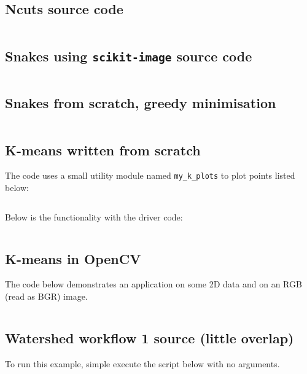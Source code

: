 \documentclass[a4paper]{article}
\begin{document}
\subsection{Ncuts source code}
\label{app:ncuts_code}
\inputminted{python}{src/ncuts/ncuts.py}

\newpage
\subsection{Snakes using \texttt{scikit-image} source code}
\label{app:snakes_code}
\inputminted{python}{src/snakes/snakes.py}

\newpage
\subsection{Snakes from scratch, greedy minimisation}
\label{app:my_snakes_code}
\inputminted{python}{src/snakes/mysnake.py}

\newpage
\subsection{K-means written from scratch}
\label{app:src_my_kmeans}
The code uses a small utility module named \texttt{my_k_plots} to plot points  listed below:
\inputminted{python}{src/kmeans/my_k_plots.py}
Below is the functionality with the driver code:
\inputminted{python}{src/kmeans/my_k_means.py}

\newpage
\subsection{K-means in OpenCV}
\label{app:src_kmeans_opencv}
The code below demonstrates an application on some 2D data and on an RGB (read as BGR) image.
\inputminted{python}{src/kmeans/k_means_cv.py}


\newpage
\subsection{Watershed workflow 1 source (little overlap)}
\label{app:watershed_workflow_1}
To run this example, simple execute the script below with no arguments.
\inputminted{python}{src/watershed/watershed_dt.py}
\end{document}
